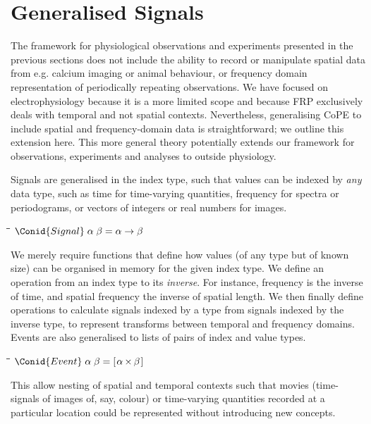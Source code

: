 \section*{Generalised Signals}
\label{sec-gensig}


The framework for physiological observations and experiments presented
in the previous sections does not include the ability to record or
manipulate spatial data from e.g. calcium imaging or animal behaviour,
or frequency domain representation of periodically repeating
observations. We have focused on electrophysiology because it is a
more limited scope and because FRP exclusively deals with temporal and
not spatial contexts. Nevertheless, generalising CoPE to include
spatial and frequency-domain data is straightforward; we outline this
extension here. This more general theory potentially extends our
framework for observations, experiments and analyses to outside
physiology.

Signals are generalised in the index type, such that values can
be indexed by \emph{any} data type, such as time for time-varying
quantities, frequency for spectra or periodograms, or vectors of
integers or real numbers for images.
\begin{tabbing}
\qquad\=\hspace{\lwidth}\=\hspace{\cwidth}\=\+\kill
$\Conid{Signal}\;\alpha\;\beta\mathrel{=}\alpha \to \beta$
\end{tabbing}
We merely require functions that define how values (of any type but of
known size) can be organised in memory for the given index type. We
define an operation from an index type to its \emph{inverse}. For
instance, frequency is the inverse of time, and spatial frequency the
inverse of spatial length. We then finally define operations to
calculate signals indexed by a type from signals indexed by the
inverse type, to represent transforms between temporal and frequency
domains. Events are also generalised to lists of pairs of index and
value types. 
\begin{tabbing}
\qquad\=\hspace{\lwidth}\=\hspace{\cwidth}\=\+\kill
${\Conid{Event}\;\alpha\;\beta\mathrel{=}[\mskip1.5mu \alpha\;\!\!\times\!\!\;\beta\mskip1.5mu]}$
\end{tabbing}
This allow nesting of spatial and temporal contexts such that movies
(time-signals of images of, say, colour) or time-varying quantities
recorded at a particular location \citep[for instance spot calcium
measurements as space-events of time-signals of
concentration;][]{DiGregorio1999} could be represented without
introducing new concepts.  

